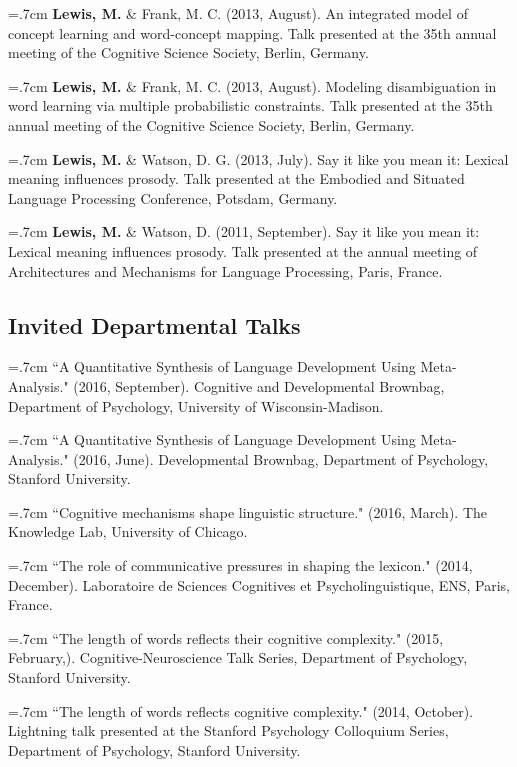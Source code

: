 \documentclass[letterpaper]{article}
\begin{document}
 \hangindent=.7cm {\bf Lewis, M.}  \& Frank, M. C. (2013, August). An integrated model of concept learning and word-concept mapping. Talk presented at the 35th annual meeting of the Cognitive Science Society, Berlin, Germany.
 
 \hangindent=.7cm {\bf Lewis, M.}  \& Frank, M. C.  (2013, August). Modeling disambiguation in word learning via multiple probabilistic constraints. Talk presented at the 35th annual meeting of the Cognitive Science Society, Berlin, Germany.
 
  \hangindent=.7cm {\bf Lewis, M.} \& Watson, D. G.  (2013, July). Say it like you mean it: Lexical meaning influences prosody. Talk presented at the Embodied and Situated Language Processing Conference, Potsdam, Germany.
 

 \hangindent=.7cm {\bf Lewis, M.}  \& Watson, D. (2011, September). Say it like you mean it: Lexical meaning influences prosody. Talk presented at the annual meeting of Architectures and Mechanisms for Language Processing, Paris, France.
 

\subsection*{Invited Departmental Talks}

\hangindent=.7cm ``A Quantitative Synthesis of Language Development Using Meta-Analysis." (2016, September). Cognitive and Developmental Brownbag, Department of Psychology,  University of Wisconsin-Madison.

\hangindent=.7cm ``A Quantitative Synthesis of Language Development Using Meta-Analysis." (2016, June). Developmental Brownbag, Department of Psychology,  Stanford University.

\hangindent=.7cm  ``Cognitive mechanisms shape linguistic structure."  (2016, March). The Knowledge Lab, University of Chicago.

\hangindent=.7cm ``The role of communicative pressures in shaping the lexicon." (2014, December). Laboratoire de Sciences Cognitives et Psycholinguistique, ENS, Paris, France.


\hangindent=.7cm ``The length of words reflects their cognitive complexity." (2015, February,). Cognitive-Neuroscience Talk Series, Department of Psychology, Stanford University.

\hangindent=.7cm ``The length of words reflects cognitive complexity." (2014, October). Lightning talk presented at the Stanford Psychology Colloquium Series, Department of Psychology, Stanford University.
\end{document}
